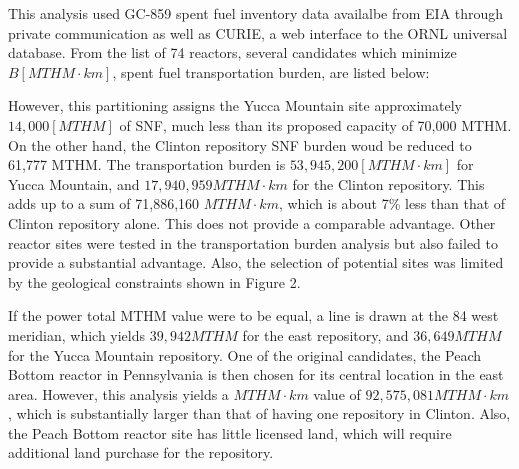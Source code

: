 This analysis used GC-859 spent fuel inventory data availalbe from \gls{EIA} 
through private communication \cite{domenico_GC-859_2016} as well as \gls{CURIE}, a web interface to 
the \gls{ORNL} universal database\cite{ornl_centralized_2016}.
From the list of 74 reactors, several candidates which minimize $B [MTHM\cdot 
km]$, spent fuel transportation burden, are listed below:
    
\begin{table}[h]
\centering

        \caption { Reactors with relatively small spent fuel transportation burden $ [MTHM\cdot km]$.}
\end {table}


However, this partitioning assigns the Yucca Mountain site approximately 
$14,000 [MTHM]$ of \gls{SNF}, much less than its proposed capacity of 70,000 MTHM. On the other hand, 
the Clinton repository \gls{SNF} burden woud be reduced to 61,777 MTHM. The transportation burden is 
$53,945,200 [MTHM\cdot km]$  
for Yucca Mountain, and $17,940,959 MTHM\cdot km$ for the Clinton repository. This 
adds up to a sum of 71,886,160 $MTHM\cdot km$, which is about 7\% less than that
of Clinton repository alone. This does not provide a comparable advantage. Other
reactor sites were tested in the transportation burden analysis but also failed
to provide a substantial advantage. Also, the selection of potential sites
was limited by the geological constraints shown in Figure 2.  

If the power total MTHM value were to be equal, a line is drawn at the 84 west
meridian, which yields $39,942 MTHM$ for the east repository, and $36,649 MTHM$ for
the Yucca Mountain repository. One of the original candidates, the Peach Bottom
reactor in Pennsylvania is then chosen for its central location in the east area.
However, this analysis yields a $MTHM\cdot km$ value of $92,575,081 MTHM\cdot km$,
which is substantially larger than that of having one repository in Clinton. 
Also, the Peach Bottom reactor site has little licensed land, which will require
additional land purchase for the repository. 

